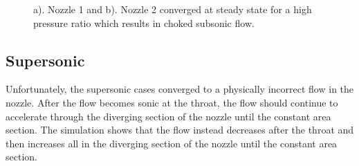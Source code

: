 \documentclass{article}%
\numberwithin{equation}{section}
\begin{document}
\begin{figure}[h!]
\caption{a). Nozzle 1 and b). Nozzle 2 converged at steady state for a high pressure ratio which results in choked subsonic flow. \label{chokesubsonic}}
\end{figure}


\subsection{Supersonic}
Unfortunately, the supersonic cases converged to a physically incorrect flow in the nozzle. After the flow becomes sonic at the throat, the flow should continue to accelerate through the diverging section of the nozzle until the constant area section. The simulation shows that the flow instead decreases after the throat and then increases all in the diverging section of the nozzle until the constant area section.
\end{document}
